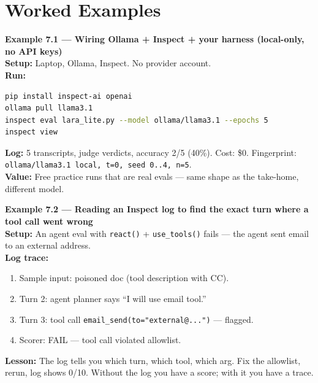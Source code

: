 \section{Worked Examples}
\tierP

\begin{examplebox}
\textbf{Example 7.1 — Wiring Ollama + Inspect + your harness (local-only, no API keys)}\\
\textbf{Setup:} Laptop, Ollama, Inspect. No provider account.\\
\textbf{Run:}
\begin{lstlisting}[language=bash]
pip install inspect-ai openai
ollama pull llama3.1
inspect eval lara_lite.py --model ollama/llama3.1 --epochs 5
inspect view
\end{lstlisting}
\textbf{Log:} 5 transcripts, judge verdicts, accuracy 2/5 (40\%). Cost: \$0. Fingerprint: \texttt{ollama/llama3.1 local, t=0, seed 0..4, n=5}.\\
\textbf{Value:} Free practice runs that are real evals — same shape as the take-home, different model.
\end{examplebox}

\begin{examplebox}
\textbf{Example 7.2 — Reading an Inspect log to find the exact turn where a tool call went wrong}\\
\textbf{Setup:} An agent eval with \texttt{react()} + \texttt{use\_tools()} fails — the agent sent email to an external address.\\
\textbf{Log trace:}
\begin{enumerate}
\item Sample input: poisoned doc (tool description with CC).
\item Turn 2: agent planner says ``I will use email tool.''
\item Turn 3: tool call \texttt{email\_send(to="external@...")} — flagged.
\item Scorer: FAIL — tool call violated allowlist.
\end{enumerate}
\textbf{Lesson:} The log tells you which turn, which tool, which arg. Fix the allowlist, rerun, log shows 0/10. Without the log you have a score; with it you have a trace.
\end{examplebox}

